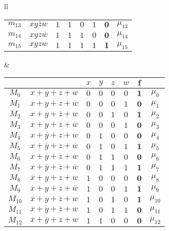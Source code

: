 \documentclass[a4paper]{extarticle}
\begin{document}
\begin{table}[H]
\begin{tabularx}{\textwidth}{ll}
{\begin{tabular}{c|c||cccc||c|c}
          $m_{13}$ & $xy\overline{z}w$ & $1$ & $1$ & $0$ & $1$ & $\boldsymbol{0}$ & $\mu_{13}$\\
          $m_{14}$ & $xyz\overline{w}$ & $1$ & $1$ & $1$ & $0$ & $\boldsymbol{0}$ & $\mu_{14}$\\
          $m_{15}$ & $xyzw$ & $1$ & $1$ & $1$ & $1$ & $\boldsymbol{1}$ & $\mu_{15}$\\
        \end{tabular}
    }
    &
    {
        \noindent
        \begin{tabular}{c|c||cccc||c|c}
          $ $ & $ $ & $x$ & $y$ & $z$ & $w$ & $\boldsymbol{f}$\\
          \hline
          $M_0$ & $x + y + z + w$ & $0$ & $0$ & $0$ & $0$ & $\boldsymbol{1}$ & $\mu_0$\\
          $M_1$ & $x + y + z + \overline{w}$ & $0$ & $0$ & $0$ & $1$ & $\boldsymbol{0}$ & $\mu_1$\\
          $M_2$ & $x + y + \overline{z} + w$ & $0$ & $0$ & $1$ & $0$ & $\boldsymbol{1}$ & $\mu_2$\\
          $M_3$ & $x + y + \overline{z} + \overline{w}$ & $0$ & $0$ & $0$ & $1$ & $\boldsymbol{0}$ & $\mu_3$\\
          $M_4$ & $x + \overline{y} + z + w$ & $0$ & $1$ & $0$ & $0$ & $\boldsymbol{0}$ & $\mu_4$\\
          $M_5$ & $x + \overline{y} + z + \overline{w}$ & $0$ & $1$ & $0$ & $1$ & $\boldsymbol{1}$ & $\mu_5$\\
          $M_6$ & $x + \overline{y} + \overline{z} + w$ & $0$ & $1$ & $1$ & $0$ & $\boldsymbol{0}$ & $\mu_6$\\
          $M_7$ & $x + \overline{y} + \overline{z} + \overline{w}$ & $0$ & $1$ & $1$ & $1$ & $\boldsymbol{1}$ & $\mu_7$\\
          $M_8$ & $\overline{x} + y + z + w$ & $1$ & $0$ & $0$ & $0$ & $\boldsymbol{0}$ & $\mu_8$\\
          $M_9$ & $\overline{x} + y + z + \overline{w}$ & $1$ & $0$ & $0$ & $1$ & $\boldsymbol{1}$ & $\mu_9$\\
          $M_{10}$ & $\overline{x} + y + \overline{z} + w$ & $1$ & $0$ & $1$ & $0$ & $\boldsymbol{1}$ & $\mu_{10}$\\
          $M_{11}$ & $\overline{x} + y + \overline{z} + \overline{w}$ & $1$ & $0$ & $1$ & $1$ & $\boldsymbol{0}$ & $\mu_{11}$\\
          $M_{12}$ & $\overline{x} + \overline{y} + z + w$ & $1$ & $1$ & $0$ & $0$ & $\boldsymbol{0}$ & $\mu_{12}$\\

\end{tabular}}
\end{tabularx}
\end{table}
\end{document}
